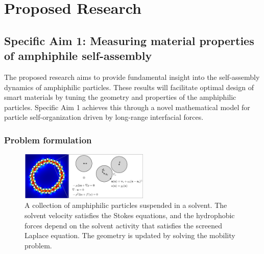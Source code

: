 \section{Proposed Research}
\label{sec:proposed-work}

\subsection{Specific Aim 1: Measuring material properties of amphiphile
  self-assembly}
\label{subsec:specific_aim_1}

The proposed research aims to provide fundamental insight into the
self-assembly dynamics of amphiphilic particles. These results will
facilitate optimal design of smart materials by tuning the geometry and
properties of the amphiphilic particles.  Specific Aim 1 achieves this
through a novel mathematical model for particle self-organization driven
by long-range interfacial forces. 

\subsubsection{Problem formulation}
\begin{figure}
  \centering
  \vspace{-12pt}
  \includegraphics[width=0.55\textwidth]{figures/SpecificAim1/Domain.pdf}
  \caption{\label{fig:flow_map} A collection of amphiphilic particles
  suspended in a solvent. The solvent velocity satisfies the Stokes
  equations, and the hydrophobic forces depend on the solvent activity
  that satisfies the screened Laplace equation. The geometry is updated
  by solving the mobility problem.}
\end{figure}

